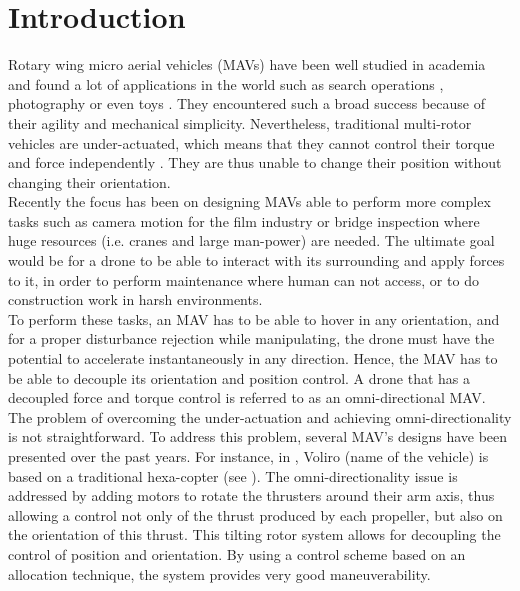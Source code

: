 \chapter{Introduction}
\label{sec:introduction}

Rotary wing micro aerial vehicles (MAVs) have been well studied in academia
and found a lot of applications in the world such as search operations
\citep{silvagni_multipurpose_2017}, photography \citep{noauthor_dji_nodate} or
even toys \citep{noauthor_aura_nodate}. They encountered such a broad success because
of their agility and mechanical simplicity. Nevertheless, traditional multi-rotor
vehicles are under-actuated, which means that they cannot control their torque
and force independently \citep{brescianini_design_2016}. They are thus unable to
change their position without changing their orientation. \\
Recently the focus has been on designing MAVs able to perform more complex
tasks such as camera motion for the film industry \citep{kamel_voliro:_2018} or
bridge inspection where huge resources (i.e. cranes and large man-power)
are needed. The ultimate goal would be for a drone to be able to interact with
its surrounding and apply forces to it, in order to perform maintenance where
human can not access, or to do construction work in harsh environments. \\
To perform these tasks, an MAV has to be able to hover in any orientation, and for a
proper disturbance rejection while manipulating, the drone must have the potential
to accelerate instantaneously in any direction. Hence, the MAV has to be able to
decouple its orientation and position control. A drone that has a decoupled
force and torque control is referred to as an omni-directional MAV. \\
The problem of overcoming the under-actuation and achieving omni-directionality
is not straightforward. To address this problem, several MAV’s designs have been
presented over the past years. For instance, in \citep{kamel_voliro:_2018}, Voliro
(name of the vehicle) is based on a traditional hexa-copter (see ).
The omni-directionality issue is addressed by adding motors to rotate the
thrusters around their arm axis, thus allowing a control not only of the thrust
produced by each propeller, but also on the orientation of this thrust. This
tilting rotor system allows for decoupling the control of position and orientation.
By using a control scheme based on an allocation technique, the system provides
very good maneuverability.

